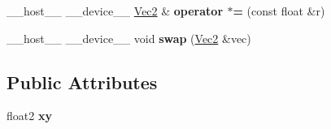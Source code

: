 \begin{DoxyCompactItemize}
\item 
\+\_\+\+\_\+host\+\_\+\+\_\+ \+\_\+\+\_\+device\+\_\+\+\_\+ \hyperlink{class_vec2}{Vec2} \& {\bfseries operator $\ast$=} (const float \&r)\hypertarget{class_vec2_ab7f2a84b847c04690ddd7823144ae591}{}\label{class_vec2_ab7f2a84b847c04690ddd7823144ae591}

\item 
\+\_\+\+\_\+host\+\_\+\+\_\+ \+\_\+\+\_\+device\+\_\+\+\_\+ void {\bfseries swap} (\hyperlink{class_vec2}{Vec2} \&vec)\hypertarget{class_vec2_a45e2ef0b091128f3d78fc691b862cdef}{}\label{class_vec2_a45e2ef0b091128f3d78fc691b862cdef}

\end{DoxyCompactItemize}
\subsection*{Public Attributes}
\begin{DoxyCompactItemize}
\item 
float2 {\bfseries xy}\hypertarget{class_vec2_ae166edaf1b05eb0634e8ceb08adf1cc3}{}\label{class_vec2_ae166edaf1b05eb0634e8ceb08adf1cc3}

\end{DoxyCompactItemize}
